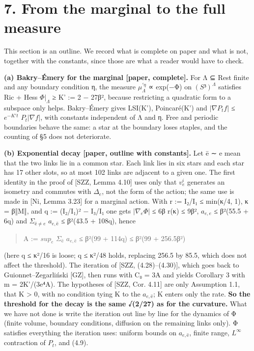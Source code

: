 \documentclass[11pt,a4paper]{article}
\theoremstyle{named}
\begin{document}
\section*{7. From the marginal to the full measure}
This section is an outline. We record what is complete on paper and what is not, together with the constants, since those are what a reader would have to check.

\textbf{(a) Bakry–Émery for the marginal [paper, complete].} For Λ ⊆ Rest finite and any boundary condition η, the measure $μ^{\prime η}_{Λ}$ ∝ exp(−Φ) on $(S³)^{Λ}$ satisfies Ric + Hess $Φ|_{Λ}$ ≥ K' := 2 − 27β², because restricting a quadratic form to a subspace only helps. Bakry–Émery gives LSI(K'), Poincaré(K') and $|∇P_tf|$ ≤ $e^{−K't}$ $P_t|∇f|$, with constants independent of Λ and η. Free and periodic boundaries behave the same: a star at the boundary loses staples, and the counting of §5 does not deteriorate.

\textbf{(b) Exponential decay [paper, outline with constants].} Let ē ∼ e mean that the two links lie in a common star. Each link lies in six stars and each star has 17 other slots, so at most 102 links are adjacent to a given one. The first identity in the proof of [SZZ, Lemma 4.10] uses only that $v_e^i$ generates an isometry and commutes with $Δ_e$, not the form of the action; the same use is made in [Ni, Lemma 3.23] for a marginal action. With r := I₂/I₁ ≤ min(κ/4, 1), κ = β‖M‖, and q := (I₂/I₁)² − I₃/I₁ one gets $|∇_eΦ|$ ≤ 6β r(κ) ≤ 9β², $a_{e,e}$ ≤ β²(55.5 + 6q) and $Σ_{ē ≠ e}$ $a_{e,ē}$ ≤ β²(43.5 + 108q), hence

\begin{quote}
A := $sup_e$ $Σ_{ē}$ $a_{e,ē}$ ≤ β²(99 + 114q) ≤ β²(99 + 256.5β²)
\end{quote}
(here q ≤ κ²/16 is loose; q ≤ κ²/48 holds, replacing 256.5 by 85.5, which does not affect the threshold). The iteration of [SZZ, (4.28)–(4.30)], which goes back to Guionnet–Zegarliński [GZ], then runs with C₀ = 3A and yields Corollary 3 with m = 2K'/(3e⁴A). The hypotheses of [SZZ, Cor. 4.11] are only Assumption 1.1, that K \textgreater{} 0, with no condition tying K to the $a_{e,ē}$; K enters only the rate. \textbf{So the threshold for the decay is the same √(2/27) as for the curvature.} What we have not done is write the iteration out line by line for the dynamics of Φ (finite volume, boundary conditions, diffusion on the remaining links only). Φ satisfies everything the iteration uses: uniform bounds on $a_{e,ē}$, finite range, $L^{∞}$ contraction of $P_t$, and (4.9).
\end{document}

